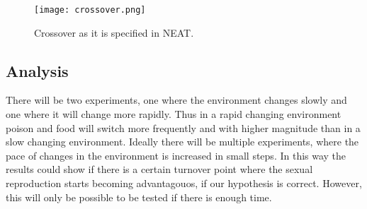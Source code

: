 \begin{figure}[H]
\centering
\texttt{[image: crossover.png]}
\caption{Crossover as it is specified in NEAT.}
\label{fig:cross}
\end{figure}

\subsection{Analysis}
There will be two experiments, one where the environment changes slowly and one where it will change more rapidly. 
Thus in a rapid changing environment poison and food will switch more frequently and with higher magnitude than in a slow changing environment.
Ideally there will be multiple experiments, where the pace of changes in the environment is increased in small steps.
In this way the results could show if there is a certain turnover point where the sexual reproduction starts becoming advantagouos, if our hypothesis is correct.
However, this will only be possible to be tested if there is enough time.